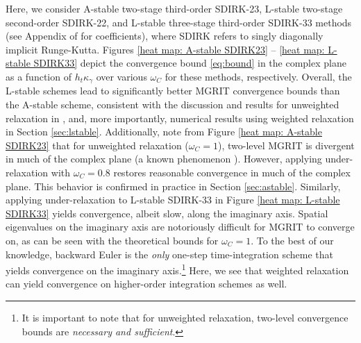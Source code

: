\documentclass[VANCOUVER,STIX1COL]{WileyNJD-v2}
\begin{document}
Here, we consider A-stable two-stage third-order SDIRK-23, L-stable two-stage second-order SDIRK-22, and L-stable three-stage third-order SDIRK-33 methods (see Appendix of \cite{FrSo2020} for coefficients), where SDIRK refers to singly diagonally implicit Runge-Kutta. Figures \ref{heat map: A-stable SDIRK23} -- \ref{heat map: L-stable SDIRK33} depict the convergence bound \eqref{eq:bound} in the complex plane as a function of $h_t \kappa_\gamma$ over various $\omega_C$ for these methods, respectively. Overall, the L-stable schemes lead to significantly better MGRIT convergence bounds than the A-stable scheme, consistent with the discussion and results for unweighted relaxation in \cite{FrSo2020}, and, more importantly, numerical results using weighted relaxation in Section
\ref{sec:lstable}. Additionally, note from Figure \ref{heat map: A-stable SDIRK23} that for unweighted relaxation ($\omega_C =1$), two-level MGRIT is divergent in much of the complex plane (a known phenomenon \cite{FrSo2020}). However, applying under-relaxation with $\omega_C = 0.8$ restores reasonable convergence in much of the complex plane. This behavior is confirmed in practice in Section \ref{sec:astable}. Similarly, applying under-relaxation to L-stable SDIRK-33 in Figure \ref{heat map: L-stable SDIRK33} yields convergence, albeit slow, along the imaginary axis. Spatial eigenvalues on the imaginary axis are notoriously difficult for MGRIT to converge on, as can be seen with the theoretical bounds for $\omega_C=1$. To the best of our knowledge, backward Euler is the \emph{only} one-step time-integration scheme that yields convergence on the imaginary axis.\footnote{It is important to note that for unweighted relaxation, two-level convergence bounds are \emph{necessary and sufficient}\cite{So2019}.} Here, we see that weighted relaxation can yield convergence on higher-order integration schemes as well.


\end{document}
